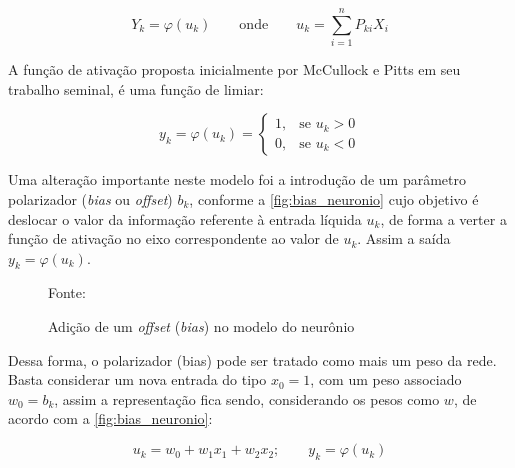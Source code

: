 \begin{equation}
	Y_k = \varphi(u_k) \qquad \textrm{onde} \qquad u_k = \sum_{i=1}^{n} P_{ki}X_i 
\end{equation}

A função de ativação proposta inicialmente por McCullock e Pitts em seu trabalho seminal,  é uma função de limiar:

\begin{equation}\label{funcao_limiar}
y_k = \varphi (u_k) = \left \{ \begin{matrix}
									1, & \mbox{se }u_k > 0 \\ 
									0, & \mbox{se }u_k < 0 
								\end{matrix} 
							\right.
\end{equation}

Uma alteração importante neste modelo foi a introdução de um parâmetro polarizador (\textit{bias} ou \textit{offset}) $b_k$, conforme a \autoref{fig:bias_neuronio} cujo objetivo é deslocar o valor da informação referente à entrada líquida $u_k$, de forma a verter a função de ativação no eixo correspondente ao valor de $u_k$. Assim a saída $y_k = \varphi(u_k)$.

\begin{figure}[h!]
	\centering
	\caption{Adição de um \textit{offset} (\textit{bias}) no modelo do neurônio}
	
	{\scriptsize 	Fonte: }
	\label{fig:bias_neuronio}
\end{figure}

Dessa forma, o polarizador (bias) pode ser tratado como mais um peso da rede. Basta considerar um nova entrada do tipo $x_0 = 1$, com um peso associado $w_0 = b_k$, assim a representação fica sendo, considerando os pesos como $w$, de acordo com a \autoref{fig:bias_neuronio}:

\begin{equation}
	u_k = w_0 + w_1x_1 + w_2x_2; \qquad y_k = \varphi(u_k)
\end{equation}


